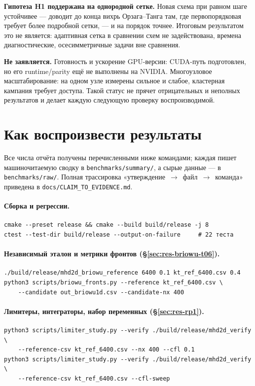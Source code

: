 \documentclass[12pt,a4paper]{article}
\newcommand{\code}[1]{\texttt{#1}}
\begin{document}
\textbf{Гипотеза H1 поддержана на однородной сетке.} Новая схема при равном шаге
устойчивее --- доводит до конца вихрь Орзага--Танга там, где первопорядковая
требует более подробной сетки, --- и на порядок точнее. Итоговым результатом это
не является: адаптивная сетка в сравнении схем не задействована, времена
диагностические, осесимметричные задачи вне сравнения.

\textbf{Не заявляется.} Готовность и ускорение GPU-версии: CUDA-путь подготовлен,
но его runtime/parity ещё не выполнены на NVIDIA. Многоузловое масштабирование:
на одном узле измерены сильное и слабое, кластерная кампания
требует доступа. Такой статус не прячет отрицательных и неполных результатов и
делает каждую следующую проверку воспроизводимой.

\appendix
\section{Как воспроизвести результаты}
\label{sec:repro}

Все числа отчёта получены перечисленными ниже командами; каждая пишет
машиночитаемую сводку в \code{benchmarks/summary/}, а сырые данные --- в
\code{benchmarks/raw/}. Полная трассировка «утверждение~$\to$~файл~$\to$~команда»
приведена в \code{docs/CLAIM\_TO\_EVIDENCE.md}.

\paragraph{Сборка и регрессии.}
\begin{verbatim}
cmake --preset release && cmake --build build/release -j 8
ctest --test-dir build/release --output-on-failure     # 22 теста
\end{verbatim}

\paragraph{Независимый эталон и метрики фронтов (\S\ref{sec:res-briowu-t06}).}
\begin{verbatim}
./build/release/mhd2d_briowu_reference 6400 0.1 kt_ref_6400.csv 0.4
python3 scripts/briowu_fronts.py --reference kt_ref_6400.csv \
    --candidate out_briowu1d.csv --candidate-nx 400
\end{verbatim}

\paragraph{Лимитеры, интеграторы, набор переменных (\S\ref{sec:res-rp1}).}
\begin{verbatim}
python3 scripts/limiter_study.py --verify ./build/release/mhd2d_verify \
    --reference-csv kt_ref_6400.csv --nx 400 --cfl 0.1
python3 scripts/limiter_study.py --verify ./build/release/mhd2d_verify \
    --reference-csv kt_ref_6400.csv --cfl-sweep
\end{verbatim}
\end{document}
